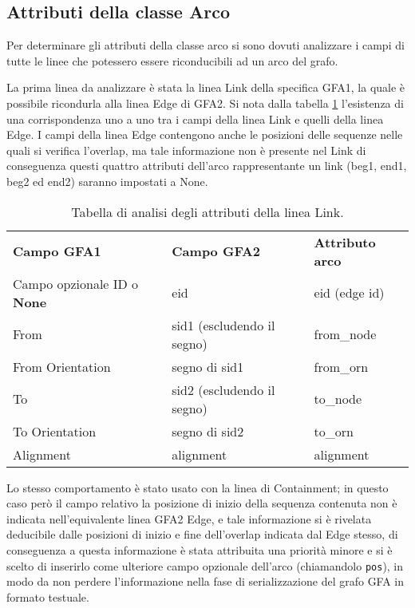 \subsection{Attributi della classe Arco}
Per determinare gli attributi della classe arco si sono dovuti analizzare i campi
di tutte le linee che potessero essere riconducibili ad un arco del grafo.

La prima linea da analizzare è stata la linea Link della specifica GFA1, la quale è
possibile ricondurla alla linea Edge di GFA2. Si nota dalla tabella \ref{tab:link-analysis}
l'esistenza di una corrispondenza uno a uno tra i campi della linea Link e quelli
della linea Edge. I campi della linea Edge contengono anche le posizioni
delle sequenze nelle quali si verifica l'overlap, ma tale informazione non è presente
nel Link di conseguenza questi quattro attributi dell'arco rappresentante un link
(beg1, end1, beg2 ed end2) saranno impostati a None.

\noindent
\begin{table}[h]
	\begin{tabularx}{\textwidth}{ | X | X | X |}
		\hline
		\textbf{Campo GFA1}	&	\textbf{Campo GFA2}			&	\textbf{Attributo arco}\\
		Campo opzionale ID o	\mbox{\textbf{None}}				&	eid					&	eid (edge id)\\
		From				&	sid1 (escludendo il segno)		&	from\_node\\
		From Orientation		&	segno di sid1					&	from\_orn\\
		To					&	sid2 (escludendo il segno)		&	to\_node\\
		To Orientation			&	segno di sid2					&	to\_orn\\
		Alignment				&	alignment						&	alignment\\
		\hline
	\end{tabularx}
	\caption{Tabella di analisi degli attributi della linea Link.}
	\label{tab:link-analysis}
\end{table}

Lo stesso comportamento è stato usato con la linea di Containment; in questo
caso però il campo relativo la posizione di inizio della sequenza contenuta non
è indicata nell'equivalente linea GFA2 Edge, e tale informazione
si è rivelata deducibile dalle posizioni di inizio e fine dell'overlap
indicata dal Edge stesso, di conseguenza a questa informazione è stata attribuita
una priorità minore e si è scelto di inserirlo come ulteriore campo opzionale dell'arco (chiamandolo
\texttt{pos}),
in modo da non perdere l'informazione nella fase di serializzazione
del grafo GFA in formato testuale.

